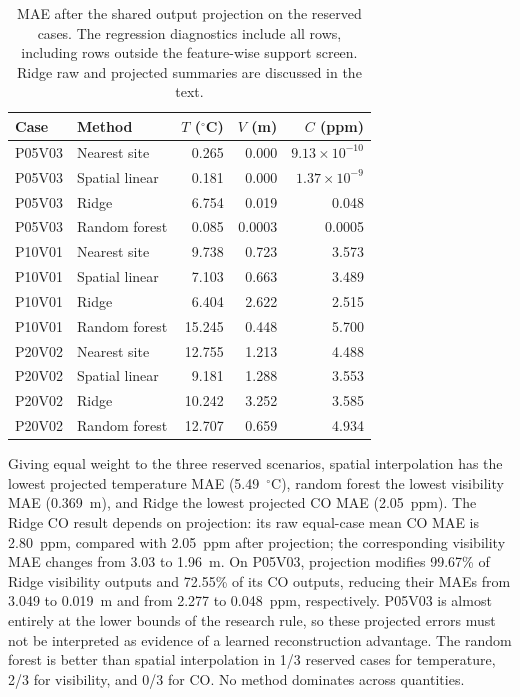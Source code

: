 \documentclass[preprint,12pt,authoryear]{elsarticle}
\begin{document}
\begin{table}[htbp]\centering\small
\caption{MAE after the shared output projection on the reserved cases.
The regression diagnostics include all rows, including rows outside the
feature-wise support screen. Ridge raw and projected summaries are
discussed in the text.}
\label{tab:reserved-mae}
\begin{tabular}{@{}llrrr@{}}\toprule
Case & Method & $T$ ($^{\circ}$C) & $V$ (m) & $C$ (ppm)\\\midrule
P05V03 & Nearest site & 0.265 & 0.000 & $9.13\times10^{-10}$\\
P05V03 & Spatial linear & 0.181 & 0.000 & $1.37\times10^{-9}$\\
P05V03 & Ridge & 6.754 & 0.019 & 0.048\\
P05V03 & Random forest & 0.085 & 0.0003 & 0.0005\\
P10V01 & Nearest site & 9.738 & 0.723 & 3.573\\
P10V01 & Spatial linear & 7.103 & 0.663 & 3.489\\
P10V01 & Ridge & 6.404 & 2.622 & 2.515\\
P10V01 & Random forest & 15.245 & 0.448 & 5.700\\
P20V02 & Nearest site & 12.755 & 1.213 & 4.488\\
P20V02 & Spatial linear & 9.181 & 1.288 & 3.553\\
P20V02 & Ridge & 10.242 & 3.252 & 3.585\\
P20V02 & Random forest & 12.707 & 0.659 & 4.934\\
\bottomrule
\end{tabular}
\end{table}

Giving equal weight to the three reserved scenarios, spatial interpolation
has the lowest projected temperature MAE (5.49~$^{\circ}$C), random forest
the lowest visibility MAE (0.369~m), and Ridge the lowest projected CO MAE
(2.05~ppm). The Ridge CO result depends on projection: its raw equal-case
mean CO MAE is 2.80~ppm, compared with 2.05~ppm after projection; the
corresponding visibility MAE changes from 3.03 to 1.96~m. On P05V03,
projection modifies 99.67\% of Ridge visibility outputs and 72.55\% of
its CO outputs, reducing their MAEs from 3.049 to 0.019~m and from 2.277
to 0.048~ppm, respectively. P05V03 is almost entirely at the lower bounds
of the research rule, so these projected errors must not be interpreted
as evidence of a learned reconstruction advantage. The random forest is
better than spatial interpolation in 1/3 reserved cases for temperature,
2/3 for visibility, and 0/3 for CO. No method dominates across quantities.
\end{document}
